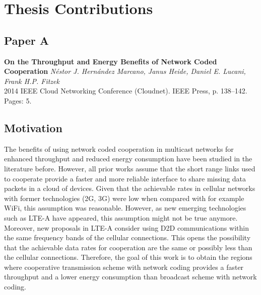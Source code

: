 \section{Thesis Contributions}\label{sec:contributions}

\subsection{Paper A}
\textbf{On the Throughput and Energy Benefits of Network Coded Cooperation}
\textit{N\'estor J. Hern\'andez Marcano, Janus Heide, Daniel E. Lucani, Frank H.P. Fitzek}
\\  2014 IEEE Cloud Networking Conference (Cloudnet). IEEE Press, p. 138--142.
\\ Pages: 5.

\subsection*{Motivation}
The benefits of using network coded cooperation in multicast networks for enhanced throughput and reduced energy consumption have been studied in the literature before. However, all prior works assume that the short range links used to cooperate provide a faster and more reliable interface to share missing data packets in a cloud of devices. Given that the achievable rates in cellular networks with former technologies (2G, 3G) were low when compared with for example WiFi, this assumption was reasonable. However, as new emerging technologies such as \ac{LTE-A} have appeared, this assumption might not be true anymore. Moreover, new proposals in \ac{LTE-A} consider using \ac{D2D} communications within the same frequency bands of the cellular connections. This opens the possibility that the achievable data rates for cooperation are the same or possibly less than the cellular connections. Therefore, the goal of this work is to obtain the regions where cooperative transmission scheme with network coding provides a faster throughput and a lower energy consumption than broadcast scheme with network coding.

